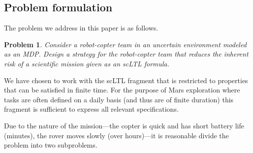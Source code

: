 \documentclass[conference]{IEEEtran}
\newtheorem{problem}{Problem}
\begin{document}

\subsection{Problem formulation}

The problem we address in this paper is as follows.

\begin{problem}
\label{prob:basic}
Consider a robot-copter team in an uncertain environment modeled as an MDP.  Design a strategy for the robot-copter team that reduces the inherent risk of a scientific mission given as an scLTL formula.
\end{problem}

We have chosen to work with the scLTL fragment that is restricted to properties that can be satisfied in finite time. For the purpose of Mars exploration where tasks are often defined on a daily basis (and thus are of finite duration) this fragment is sufficient to express all relevant specifications.


Due to the nature of the mission---the copter is quick and has short battery life (minutes), the rover moves slowly (over hours)---it is reasonable divide the problem into two subproblems.
\end{document}
